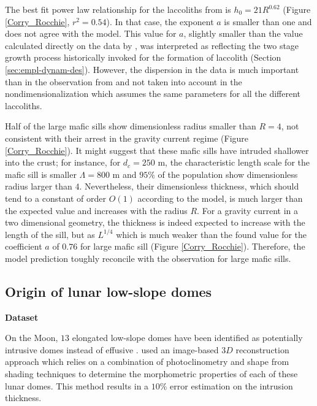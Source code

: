 The  best  fit   power  law  relationship  for   the  laccoliths  from
\citet{E:2015tl} is  $h_0 = 21 R^{0.62}$  (Figure \ref{Corry_Rocchie},
$r^2 =0.54$). In  that case, the exponent $a$ is  smaller than one and
does not agree  with the model.  This value for  $a$, slightly smaller
than    the   value    calculated    directly   on    the   data    by
\citet{McCaffrey:1997ea}, was interpreted as  reflecting the two stage
growth  process historically  invoked for  the formation  of laccolith
(Section  \ref{sec:empl-dynam-des}). However,  the  dispersion in  the
data   is    much   important    than   in   the    observation   from
\citet{Rocchi:2010dn}   and   not   taken    into   account   in   the
nondimensionalization which  assumes the  same parameters for  all the
different laccoliths.

Half of the  large mafic sills show dimensionless  radius smaller than
$R=4$, not consistent with their  arrest in the gravity current regime
(Figure \ref{Corry_Rocchie}).  It might suggest that these mafic sills
have intruded shallower into the crust; for instance, for $d_c=250$ m,
the  characteristic  length  scale  for  the  mafic  sill  is  smaller
$\Lambda=800$ m and $95\%$ of the population show dimensionless radius
larger than  $4$. Nevertheless,  their dimensionless  thickness, which
should tend to  a constant of order $O(1)$ according  to the model, is
much larger than the expected value and increases with the radius $R$.
For a gravity current in a  two dimensional geometry, the thickness is
indeed  expected to  increase  with the  length of  the  sill, but  as
$L^{1/4}$ \citet{Michaut:2011kg}  which is much weaker  than the found
value for the  coefficient $a$ of $0.76$ for large  mafic sill (Figure
\ref{Corry_Rocchie}).   Therefore,   the  model   prediction   toughly
reconcile with the observation for large mafic sills.

\subsection{Origin of lunar low-slope domes}
\label{sec:observ-vs-pred}

\vspace{.5cm}\hspace{.5cm} \textbf{Dataset} \vspace{.5cm}

On the  Moon, $13$ elongated  low-slope domes have been  identified as
potentially      intrusive     domes      instead     of      effusive
\citep{Wohler:2007it,Wohler:2009jj}.   \citet{Wohler:2009jj}  used  an
image-based $3D$ reconstruction approach which relies on a combination
of photoclinometry and shape from  shading techniques to determine the
morphometric  properties of  each of  these lunar  domes. This  method
results in a $10\%$ error estimation on the intrusion thickness.




